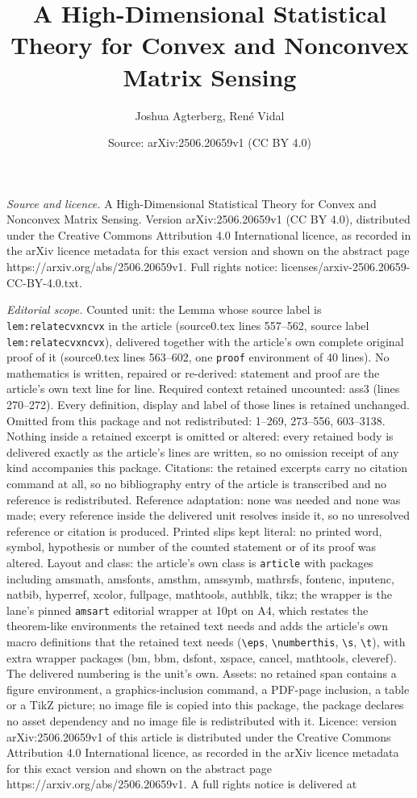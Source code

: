 \documentclass[10pt,a4paper]{amsart}
\title[A High-Dimensional Statistical Theory for Convex and Nonconv]{A High-Dimensional Statistical Theory for Convex and Nonconvex Matrix Sensing}
\author{Joshua Agterberg, Ren\'e Vidal}
\date{Source: arXiv:2506.20659v1 (CC BY 4.0)}
\begin{document}
\maketitle

\noindent\emph{Source and licence.} A High-Dimensional Statistical Theory for Convex and Nonconvex Matrix Sensing. Version arXiv:2506.20659v1 (CC BY 4.0), distributed under the Creative Commons Attribution 4.0 International licence, as recorded in the arXiv licence metadata for this exact version and shown on the abstract page https://arxiv.org/abs/2506.20659v1. Full rights notice: licenses/arxiv-2506.20659-CC-BY-4.0.txt.\par\smallskip

\noindent\textit{Editorial scope.} Counted unit: the Lemma whose source label is \texttt{lem:relatecvxncvx} in the article (source0.tex lines 557--562, source label \texttt{lem:relatecvxncvx}), delivered together with the article's own complete original proof of it (source0.tex lines 563--602, one \texttt{proof} environment of 40 lines). No mathematics is written, repaired or re-derived: statement and proof are the article's own text line for line. Required context retained uncounted: ass3 (lines 270--272). Every definition, display and label of those lines is retained unchanged. Omitted from this package and not redistributed: 1--269, 273--556, 603--3138. Nothing inside a retained excerpt is omitted or altered: every retained body is delivered exactly as the article's lines are written, so no omission receipt of any kind accompanies this package. Citations: the retained excerpts carry no citation command at all, so no bibliography entry of the article is transcribed and no reference is redistributed. Reference adaptation: none was needed and none was made; every reference inside the delivered unit resolves inside it, so no unresolved reference or citation is produced. Printed slips kept literal: no printed word, symbol, hypothesis or number of the counted statement or of its proof was altered. Layout and class: the article's own class is \texttt{article} with packages including amsmath, amsfonts, amsthm, amssymb, mathrsfs, fontenc, inputenc, natbib, hyperref, xcolor, fullpage, mathtools, authblk, tikz; the wrapper is the lane's pinned \texttt{amsart} editorial wrapper at 10pt on A4, which restates the theorem-like environments the retained text needs and adds the article's own macro definitions that the retained text needs (\texttt{\textbackslash eps}, \texttt{\textbackslash numberthis}, \texttt{\textbackslash s}, \texttt{\textbackslash t}), with extra wrapper packages (bm, bbm, dsfont, xspace, cancel, mathtools, cleveref). The delivered numbering is the unit's own. Assets: no retained span contains a figure environment, a graphics-inclusion command, a PDF-page inclusion, a table or a TikZ picture; no image file is copied into this package, the package declares no asset dependency and no image file is redistributed with it. Licence: version arXiv:2506.20659v1 of this article is distributed under the Creative Commons Attribution 4.0 International licence, as recorded in the arXiv licence metadata for this exact version and shown on the abstract page https://arxiv.org/abs/2506.20659v1. A full rights notice is delivered at 
\end{document}
